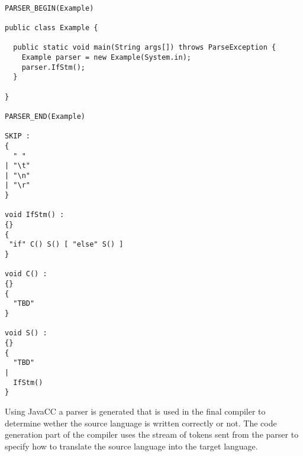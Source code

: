 \begin{lstlisting}[caption={One of JavaCC's standard examples on how to make a grammar that accepts ``if''-statements.}, label=lst:javacc-grammar-example]

PARSER_BEGIN(Example)

public class Example {

  public static void main(String args[]) throws ParseException {
    Example parser = new Example(System.in);
    parser.IfStm();
  }

}

PARSER_END(Example)

SKIP :
{
  " "
| "\t"
| "\n"
| "\r"
}

void IfStm() :
{}
{
 "if" C() S() [ "else" S() ]
}

void C() :
{}
{
  "TBD"
}

void S() :
{}
{
  "TBD"
|
  IfStm()
}
\end{lstlisting}

Using JavaCC a parser is generated that is used in the final compiler to determine wether the source language is written correctly or not. The code generation part of the compiler uses the stream of tokens sent from the parser to specify how to translate the source language into the target language. 